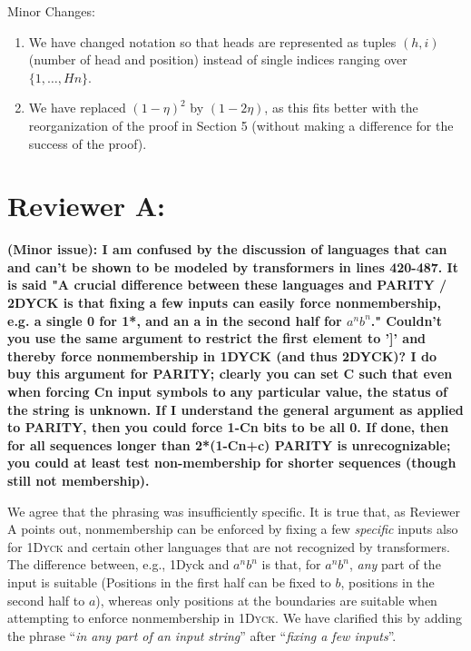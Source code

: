 \documentclass[11pt,a4paper]{article}
\newcommand\response[1]{{\color{blue}#1}}
\newcommand\newtext[1]{``\textit{#1}''}
\newcommand\original[1]{\textbf{#1}}
\begin{document}
\response{Minor Changes:}
\begin{enumerate}
\item \response{We have changed notation so that heads are represented as tuples $(h,i)$ (number of head and position) instead of single indices ranging over $\{1, \dots, Hn\}$.}
\item \response{We have replaced $(1-\eta)^2$ by $(1-2\eta)$, as this fits better with the reorganization of the proof in Section 5 (without making a difference for the success of the proof).}
\end{enumerate}


\section{Reviewer A:}

\original{(Minor issue): I am confused by the discussion of languages that can and
can't be
shown to be modeled by transformers in lines 420-487. It is said "A
crucial difference between these languages and PARITY / 2DYCK is that
fixing a few inputs can easily force nonmembership, e.g. a single 0
for 1*, and an a in the second half for $a^n b^n$." Couldn't you use the
same argument to restrict the first element to ']' and thereby force
nonmembership in 1DYCK (and thus 2DYCK)? I do buy this
argument for PARITY; clearly you can set C such that even when forcing
Cn input symbols to any particular value, the status of the string is
unknown. If I understand the general argument as applied to PARITY,
then you could force 1-Cn bits to be all 0. If done, then for all
sequences longer than 2*(1-Cn+c) PARITY is unrecognizable; you could
at least test non-membership for shorter sequences (though still not
membership).}

\response{We agree that the phrasing was insufficiently specific. It is true that, as Reviewer A points out, nonmembership can be enforced by fixing a few \emph{specific} inputs also for \textsc{1Dyck} and certain other languages that are not recognized by transformers. The difference between, e.g., 1Dyck and $a^nb^n$ is that, for $a^nb^n$, \emph{any} part of the input is suitable (Positions in the first half can be fixed to $b$, positions in the second half to $a$), whereas only positions at the boundaries are suitable when attempting to enforce nonmembership in \textsc{1Dyck}. We have clarified this by adding the phrase \newtext{in any part of an input string} after \newtext{fixing a few inputs}.}
\end{document}
